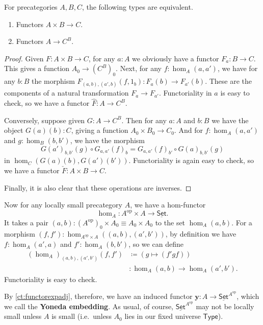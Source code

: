 \documentclass{amsart}
\newcommand{\jdeq}{\equiv}      %
\newcommand{\defeq}{\coloneqq}  %
\newcommand{\type}{\ensuremath{\mathsf{Type}}\xspace}
\renewcommand{\set}{\ensuremath{\mathsf{Set}}\xspace}
\newcommand{\uset}{\ensuremath{\underline{\set}}\xspace}
\theoremstyle{definition}
\theoremstyle{remark}
\numberwithin{equation}{section}
\newcommand{\op}{^{\textrm{op}}}
\newcommand{\y}{\ensuremath{\mathbf{y}}\xspace}
\begin{document}
\begin{lem}\label{ct:functorexpadj}
  For precategories $A,B,C$, the following types are equivalent.
  \begin{enumerate}
  \item Functors $A\times B\to C$.
  \item Functors $A\to C^B$.
  \end{enumerate}
\end{lem}
\begin{proof}
  Given $F:A\times B\to C$, for any $a:A$ we obviously have a functor $F_a : B\to C$.
  This gives a function $A_0 \to (C^B)_0$.
  Next, for any $f:\hom_A(a,a')$, we have for any $b:B$ the morphism $F_{(a,b),(a',b)}(f,1_b):F_a(b) \to F_{a'}(b)$.
  These are the components of a natural transformation $F_a \to F_{a'}$.
  Functoriality in $a$ is easy to check, so we have a functor $\widehat{F}:A\to C^B$.

  Conversely, suppose given $G:A\to C^B$.
  Then for any $a:A$ and $b:B$ we have the object $G(a)(b):C$, giving a function $A_0 \times B_0 \to C_0$.
  And for $f:\hom_A(a,a')$ and $g:\hom_B(b,b')$, we have the morphism
  \begin{equation*}
     G(a')_{b,b'}(g)\circ G_{a,a'}(f)_b = G_{a,a'}(f)_{b'} \circ  G(a)_{b,b'}(g)
  \end{equation*}
  in $\hom_C(G(a)(b), G(a')(b'))$.
  Functoriality is again easy to check, so we have a functor $\check{F}:A\times B \to C$.

  Finally, it is also clear that these operations are inverses.
\end{proof}

Now for any locally small precategory $A$, we have a hom-functor
\[\hom_A : A\op \times A \to \uset.\]
It takes a pair $(a,b): (A\op)_0 \times A_0 \jdeq A_0 \times A_0$ to the set $\hom_A(a,b)$.
For a morphism $(f,f') : \hom_{A\op\times A}((a,b),(a',b'))$, by definition we have $f:\hom_A(a',a)$ and $f':\hom_A(b,b')$, so we can define
\begin{align*}
  (\hom_A)_{(a,b),(a',b')}(f,f')
  &\defeq (g \mapsto (f'gf))\\
  &: \hom_A(a,b) \to \hom_A(a',b').
\end{align*}
Functoriality is easy to check.

By \autoref{ct:functorexpadj}, therefore, we have an induced functor $\y:A\to \uset^{A\op}$, which we call the \textbf{Yoneda embedding}.
As usual, of course, $\uset^{A\op}$ may not be locally small unless $A$ is small (i.e.\ unless $A_0$ lies in our fixed universe \type).
\end{document}
